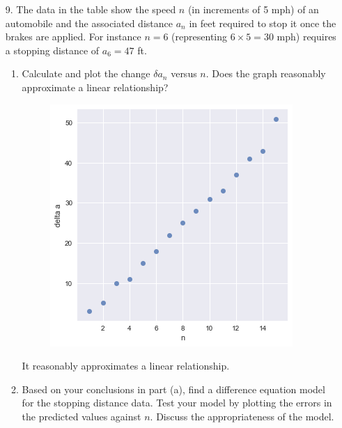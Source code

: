 \documentclass[10pt]{report}
\begin{document}
\begin{enumerate}
	\item [9.]
	The data in the table show the speed $n$ (in increments of 5 mph) of an automobile and the associated distance $a_n$ in feet required to stop it once the brakes are applied. For instance $n=6$ (representing $6\times 5 = 30$ mph) requires a stopping distance of $a_6 = 47$ ft.
	\begin{enumerate}
		\item 
		Calculate and plot the change $\delta a_n$ versus $n$. Does the graph reasonably approximate a linear relationship?
		\begin{figure}[H]
			\centering
			\includegraphics[width=0.4\linewidth]{s1_2/da-n.png}
		\end{figure}
		It reasonably approximates a linear relationship.
		
		\item 
		Based on your conclusions in part (a), find a difference equation model for the stopping distance data. Test your model by plotting the errors in the predicted values against $n$. Discuss the appropriateness of the model.
		

\end{enumerate}
\end{enumerate}
\end{document}
